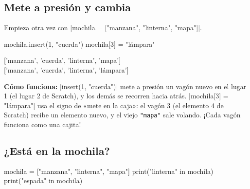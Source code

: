 \subsection*{Mete a presión y cambia}

Empieza otra vez con \py|mochila = ["manzana", "linterna", "mapa"]|.

\begin{center}
\begin{scratch}
\end{scratch}
\end{center}
\begin{code}
mochila.insert(1, "cuerda")
mochila[3] = "lámpara"
\end{code}

\begin{outputbox}
{[}'manzana', 'cuerda', 'linterna', 'mapa']\\
{[}'manzana', 'cuerda', 'linterna', 'lámpara']
\end{outputbox}

\textbf{Cómo funciona:} \py|insert(1, "cuerda")| mete a presión un vagón nuevo en el lugar 1 (el lugar 2 de Scratch), y los demás se recorren hacia atrás. \py|mochila[3] = "lámpara"| usa el signo de «mete en la caja»: el vagón 3 (el elemento 4 de Scratch) recibe un elemento nuevo, y el viejo \texttt{"mapa"} sale volando. ¡Cada vagón funciona como una cajita!

\subsection*{¿Está en la mochila?}

\begin{center}
\begin{scratch}
\end{scratch}
\end{center}
\begin{code}
mochila = ["manzana", "linterna", "mapa"]
print("linterna" in mochila)
print("espada" in mochila)
\end{code}

